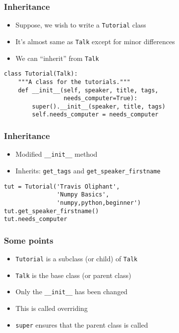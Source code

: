 \documentclass[14pt,compress,aspectratio=169]{beamer}
\begin{document}
\begin{frame}[fragile]
  \frametitle{Inheritance}
  \vspace*{-0.1in}
  \begin{itemize}
  \item Suppose, we wish to write a \lstinline{Tutorial} class
  \item It's almost same as \lstinline{Talk} except for minor differences
  \item We can ``inherit'' from \lstinline{Talk}
  \end{itemize}
  \pause
  \begin{lstlisting}
class Tutorial(Talk):
    """A class for the tutorials."""
    def __init__(self, speaker, title, tags,
                 needs_computer=True):
        super().__init__(speaker, title, tags)
        self.needs_computer = needs_computer
  \end{lstlisting}
\end{frame}

\begin{frame}[fragile]
  \frametitle{Inheritance}
  \vspace*{-0.1in}
  \begin{itemize}
  \item Modified \lstinline{__init__} method
  \item Inherits: \lstinline{get_tags} and
    \lstinline{get_speaker_firstname}
  \end{itemize}
  \begin{lstlisting}
tut = Tutorial('Travis Oliphant',
               'Numpy Basics',
               'numpy,python,beginner')
tut.get_speaker_firstname()
tut.needs_computer
  \end{lstlisting}
\end{frame}

\begin{frame}
  \frametitle{Some points}
  \begin{itemize}
  \item \lstinline{Tutorial} is a subclass (or child) of \lstinline{Talk}
  \item \lstinline{Talk} is the base class (or parent class)
  \item Only the \lstinline{__init__} has been changed
  \item This is called overriding
  \item \lstinline{super} ensures that the parent class is called
  \end{itemize}
\end{frame}
\end{document}
